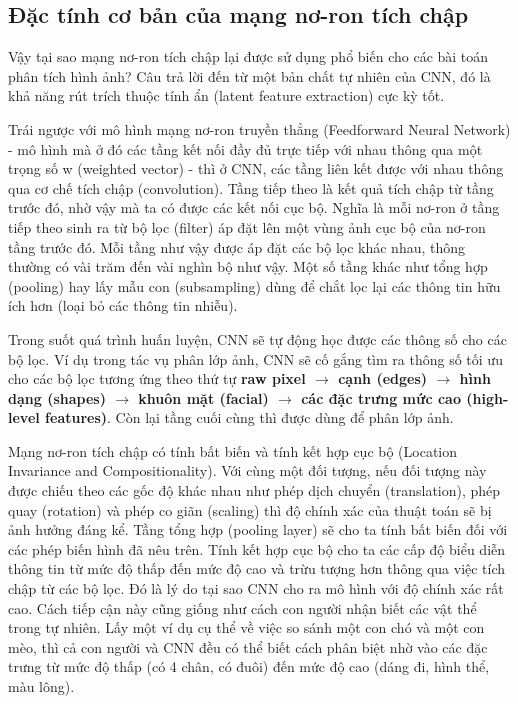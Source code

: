 \documentclass[a4paper]{article}
\begin{document}
\subsection{Đặc tính cơ bản của mạng nơ-ron tích chập}
Vậy tại sao mạng nơ-ron tích chập lại được sử dụng phổ biến cho các bài toán phân
tích hình ảnh? Câu trả lời đến từ một bản chất tự nhiên của CNN, đó là khả năng rút trích thuộc tính ẩn (latent feature extraction) cực kỳ tốt. 

Trái ngược với mô hình mạng nơ-ron truyền thẳng  (Feedforward Neural Network) - mô hình mà ở đó các tầng kết nối đầy đủ trực tiếp với nhau thông qua một trọng số w (weighted vector) - thì ở CNN, các tầng liên kết được với nhau thông qua cơ chế tích chập (convolution). Tầng tiếp theo là kết quả tích chập từ tầng trước đó, nhờ vậy mà ta có được các kết nối cục bộ. Nghĩa là mỗi nơ-ron ở tầng tiếp theo sinh ra từ bộ lọc (filter) áp đặt lên một vùng ảnh cục bộ của nơ-ron tầng trước đó. Mỗi tầng như vậy được áp đặt các bộ lọc khác nhau, thông thường có vài trăm đến vài nghìn bộ như vậy. Một số tầng khác như tổng hợp (pooling) hay lấy mẫu con (subsampling)
dùng để chắt lọc lại các thông tin hữu ích hơn (loại bỏ các thông tin nhiễu).

Trong suốt quá trình huấn luyện, CNN sẽ tự động học được các thông số cho các bộ lọc. Ví dụ trong tác vụ phân lớp ảnh, CNN sẽ cố gắng tìm ra thông số tối ưu cho các bộ lọc tương ứng theo thứ tự \textbf{raw pixel $\rightarrow$ cạnh (edges) $\rightarrow$ hình dạng (shapes) $\rightarrow$ khuôn mặt (facial) $\rightarrow$ các đặc trưng mức cao (high-level features)}. Còn lại tầng cuối cùng thì được dùng để phân lớp ảnh. 

Mạng nơ-ron tích chập có tính bất biến và tính kết hợp cục bộ (Location Invariance and Compositionality). Với cùng một đối tượng, nếu đối tượng này được chiếu theo các gốc độ khác nhau như phép dịch chuyển (translation), phép quay (rotation) và phép co giãn (scaling) thì độ chính xác của thuật toán sẽ bị ảnh hưởng đáng kể. Tầng tổng hợp (pooling layer) sẽ cho ta tính bất biến đối với các phép biến hình đã nêu trên. Tính kết hợp cục bộ cho ta các cấp độ biểu diễn thông tin từ mức độ thấp đến mức độ cao và trừu tượng hơn thông qua việc tích chập từ các bộ lọc. Đó là lý do tại sao CNN cho ra mô hình với độ chính xác rất cao. Cách tiếp cận này cũng giống như cách con người nhận biết các vật thể trong tự nhiên. Lấy một ví dụ cụ thể về việc so sánh một con chó và một con mèo, thì cả con người và CNN đều có thể biết cách phân biệt nhờ vào các đặc trưng từ mức độ thấp (có 4 chân, có đuôi) đến mức độ cao (dáng đi, hình thể, màu lông).
\end{document}
